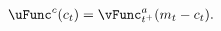   \begin{equation}\begin{gathered}\begin{aligned}
        \uFunc^{{c}}({c}_{t})   & = \vEndStget^{{a}}({m}_{t}-{c}_{t}).
        \label{eq:upEqbetaOp}
      \end{aligned}\end{gathered}\end{equation}
